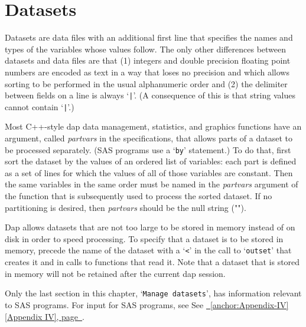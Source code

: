 \documentclass{book}
\newcommand\Texinfocommandstyletextvar[1]{{\normalfont{}\textsl{#1}}}%
\renewcommand{\_}{\Texinfounderscore\discretionary{}{}{}}
\begin{document}
\chapter{{Datasets}}
\label{anchor:Datasets}%

Datasets
%
are data files with an additional first line that
specifies the names and types of the variables whose values follow.
The only other differences between datasets and data files are that
(1) integers and double precision floating point numbers are encoded
as text in a way that loses no precision and which allows sorting
to be performed in the usual alphanumeric order and (2) the delimiter
between fields on a line is always `\texttt{|}'.  (A consequence of this
is that string values
%
%
cannot contain `\texttt{|}'.)

%
%
%
Most C++-style dap data management, statistics, and graphics functions
have an argument, called \Texinfocommandstyletextvar{partvars} in the specifications,
that allows parts of a dataset to be processed separately.
(SAS programs use a `\texttt{by}' statement.)
To do that, first sort the dataset by the values of an
ordered list of variables: each part is defined as a set of lines
for which the values of all of those variables are constant.
Then the same variables in the same order must be named in the \Texinfocommandstyletextvar{partvars} argument 
of the function that is subsequently used to process the sorted dataset. 
If no partitioning is desired, then \Texinfocommandstyletextvar{partvars} should be the null string ("").

Dap allows datasets
%
%
%
that are not too large to be stored in memory instead of on disk in order
to speed processing.
To specify that a dataset is to be stored in memory,
precede the name of the dataset with a `\texttt{<}'
in the call to `\texttt{outset}' that creates it and in calls to functions that read it.
Note that a dataset that is stored in memory will not be retained after the
current dap session.

Only the last section in this chapter, `\texttt{Manage datasets}', has information
relevant to SAS programs.
For input for SAS programs, see See \hyperref[anchor:Appendix-IV]{\chaptername~\ref*{anchor:Appendix-IV} [Appendix IV], page~\pageref*{anchor:Appendix-IV}}.
\end{document}
